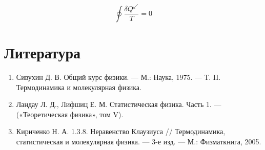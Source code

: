 \documentclass[a4paper,14pt]{article} %
\begin{document}
\begin{equation*}
\oint \frac{\delta Q^{\swarrow}}{T}=0
\end{equation*}

\section{Литература}

\begin{enumerate}
\item Сивухин Д. В. Общий курс физики. — М.: Наука, 1975. — Т. II. Термодинамика и молекулярная физика.

\item Ландау Л. Д., Лифшиц Е. М. Статистическая физика. Часть 1. — («Теоретическая физика», том V).

\item Кириченко Н. А. 1.3.8. Неравенство Клаузиуса // Термодинамика, статистическая и молекулярная физика. — 3-е изд. — М.: Физматкнига, 2005.
\end{enumerate}
\end{document}
